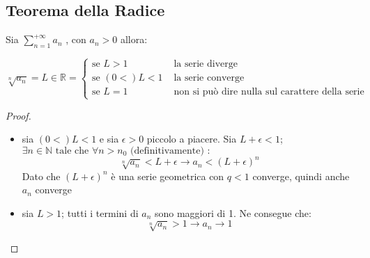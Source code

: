 \documentclass[a4paper,12pt, oneside]{book}
\begin{document}
\subsection{Teorema della Radice}
\begin{teorema}
Sia $\sum_{n=1}^{+\infty} a_n$ , con $a_n>0$ allora:
\begin{center}
 $\sqrt[n]{a_n}=L\in \mathbb{R}=\left\{
                \begin{array}{ll}
                \mbox{se  } L>1 & \mbox{  la serie diverge}\\
                \mbox{se  } (0<)L<1 & \mbox{  la serie converge}\\
                \mbox{se  } L=1 & \mbox{  non si può dire nulla sul carattere della serie}
				\end{array}
				\right.$
\end{center}
\end{teorema}
\begin{proof}
\begin{itemize}
\item sia $(0<)L<1$ e sia $\epsilon >0$ piccolo a piacere. Sia $L+\epsilon<1$; $\exists n\in\mathbb{N} \mbox{  tale che  } \forall n>n_0\mbox{  (definitivamente) }:$
$$\sqrt[n]{a_n}<L+\epsilon \longrightarrow a_n<{(L+\epsilon)}^{n}$$
Dato che ${(L+\epsilon)}^{n}$ è una serie geometrica con $q<1$ converge, quindi anche $a_n$ converge
\item sia $L>1$; tutti i termini di $a_n$ sono maggiori di 1. Ne consegue che:
 $$\sqrt[n]{a_n}>1 \longrightarrow a_n\rightarrow 1$$
\end{itemize}
\end{proof}
\newpage
\end{document}

